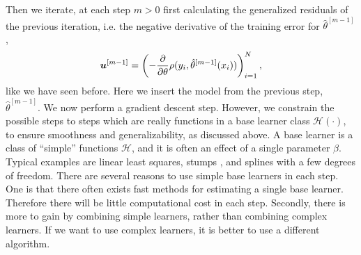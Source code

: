 Then we iterate, at each step $m>0$ first calculating the generalized residuals of the previous iteration, i.e. the negative derivative of the training error for $\hat{\theta}^{[m-1]}$,
\begin{equation*}
    \bm{u}^{[m-1]}=\left(-\frac{\partial}{\partial \theta}\rho(y_i, \hat{\theta}^{[m-1]}(x_i))\right)_{i=1}^N,
\end{equation*}
like we have seen before.
Here we insert the model from the previous step, $\hat{\theta}^{[m-1]}$.
We now perform a gradient descent step.
However, we constrain the possible steps to steps which are really functions in a base learner class $\mathcal{H}(\cdot)$, to ensure smoothness and generalizability, as discussed above.
A base learner is a class of ``simple'' functions $\mathcal{H}$, and it is often an effect of a single parameter $\beta$.
Typical examples are linear least squares, stumps \citep[trees with one split, see][]{buhlmann2007,ESL}, and splines with a few degrees of freedom.
There are several reasons to use simple base learners in each step.
One is that there often exists fast methods for estimating a single base learner.
Therefore there will be little computational cost in each step. 
Secondly, there is more to gain by combining simple learners, rather than combining complex learners.
If we want to use complex learners, it is better to use a different algorithm.

